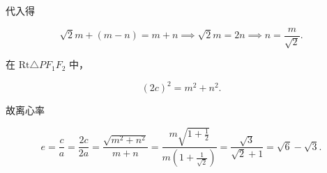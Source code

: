 \begin{answer}
代入得

\nopagebreak[4]
\[
\sqrt{2}m+(m-n)=m+n\implies \sqrt{2}m=2n\implies n=\frac{m}{\sqrt{2}}.
\]

在 $\mathrm{Rt}\triangle PF_{1}F_{2}$ 中，

\nopagebreak[4]
\[
(2c)^{2}=m^{2}+n^{2}.
\]

故离心率

\nopagebreak[4]
\[
e=\frac{c}{a}=\frac{2c}{2a}
=\frac{\sqrt{m^{2}+n^{2}}}{m+n}
=\frac{m\sqrt{1+\frac{1}{2}}}{m\left(1+\frac{1}{\sqrt{2}}\right)}
=\frac{\sqrt{3}}{\sqrt{2}+1}
=\sqrt{6}-\sqrt{3}.
\]



\end{answer}
